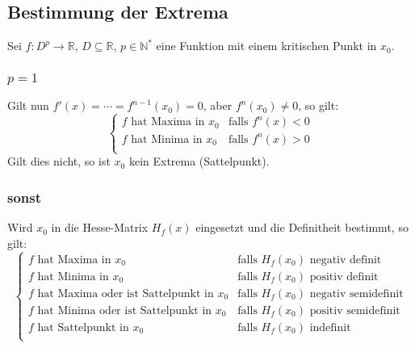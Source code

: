         \subsection{Bestimmung der Extrema}
            Sei $ f : D ^ p \rightarrow \mathbb{R} $, $ D \subseteq \mathbb{R} $, $ p \in \mathbb{N} ^ * $ eine Funktion mit einem kritischen Punkt in $ x _ 0 $.

            \subsubsection{$ p = 1 $}
                Gilt nun $ f'(x) = \cdots = f ^ { n - 1 } (x _ 0) = 0 $, aber $ f ^ n (x _ 0) \neq 0 $, so gilt:
                \begin{equation*}
                    \begin{cases}
                        f \text{ hat Maxima in } x _ 0 & \text{falls } f ^ n (x) < 0 \\
                        f \text{ hat Minima in } x _ 0 & \text{falls } f ^ n (x) > 0 \\
                    \end{cases}
                \end{equation*}
                Gilt dies nicht, so ist $ x _ 0 $ kein Extrema (Sattelpunkt).

            \subsubsection{sonst}
                Wird $ x _ 0 $ in die Hesse-Matrix $ H _ f (x) $ eingesetzt und die Definitheit bestimmt, so gilt:
                \begin{equation*}
                    \begin{cases}
                        f \text{ hat Maxima in } x _ 0 & \text{falls } H _ f (x _ 0) \text{ negativ definit} \\
                        f \text{ hat Minima in } x _ 0 & \text{falls } H _ f (x _ 0) \text{ positiv definit} \\
                        f \text{ hat Maxima oder ist Sattelpunkt in } x _ 0 & \text{falls } H _ f (x _ 0) \text{ negativ semidefinit} \\
                        f \text{ hat Minima oder ist Sattelpunkt in } x _ 0 & \text{falls } H _ f (x _ 0) \text{ positiv semidefinit} \\
                        f \text{ hat Sattelpunkt in } x _ 0 & \text{falls } H _ f (x _ 0) \text{ indefinit} \\
                    \end{cases}
                \end{equation*}


